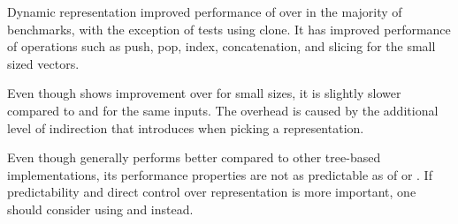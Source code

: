Dynamic representation improved performance of \pvec{} over \rrbvec{} in the majority of benchmarks, with the exception of tests using clone. It has improved performance of operations such as push, pop, index, concatenation, and slicing for the small sized vectors.

Even though \pvec{} shows improvement over \rrbvec{} for small sizes, it is slightly slower compared to \stdvec{} and \rrbvec{} for the same inputs. The overhead is caused by the additional level of indirection that \pvec{} introduces when picking a representation. 


Even though \pvec{} generally performs better compared to other tree-based implementations, its performance properties are not as predictable as of \stdvec{} or \rrbvec{}. If predictability and direct control over representation is more important, one should consider using \rrbvec{} and \stdvec{} instead. 